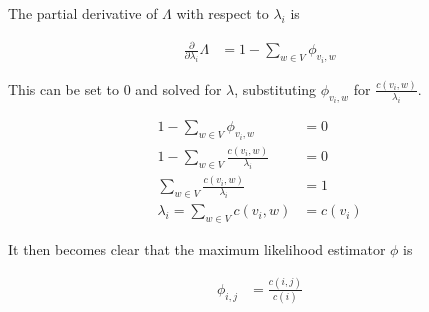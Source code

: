 \documentclass[11pt]{article}
\begin{document}
The partial derivative of $\Lambda$ with respect to $\lambda_i$ is

\begin{align*}
\frac{\partial}{\partial \lambda_i} \Lambda &= 1 - \sum \limits_{w \in V} \phi_{v_i, w}
\end{align*}

This can be set to $0$ and solved for $\lambda$, substituting $\phi_{v_i, w}$ for $ \frac{c \left( v_i, w \right)}{\lambda_i}$.

\begin{align*}
1 - \sum \limits_{w \in V} \phi_{v_i, w} &= 0 \\
%
1 - \sum \limits_{w \in V}  \frac{c \left( v_i, w \right)}{\lambda_i} &= 0 \\
%
\sum \limits_{w \in V}  \frac{c \left( v_i, w \right)}{\lambda_i} &= 1 \\
%
\lambda_i = \sum \limits_{w \in V} c \left( v_i, w \right) &= c \left( v_i \right)
\end{align*}

It then becomes clear that the maximum likelihood estimator $\phi$ is

\begin{align*}
\phi_{i, j} &= \frac{c \left( i, j \right)}{c \left( i \right)}
\end{align*}
\end{document}
